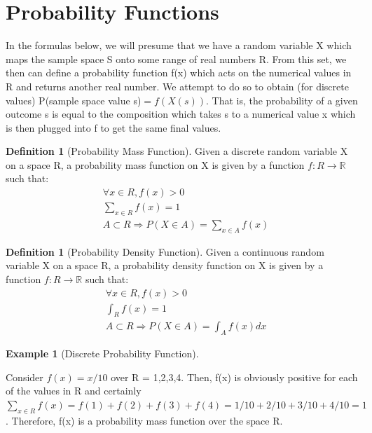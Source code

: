\documentclass[10pt,]{book}
\theoremstyle{plain}
\theoremstyle{definition}
\newtheorem{definition}[theorem]{Definition}
\theoremstyle{definition}
\newtheorem{example}[theorem]{Example}
\theoremstyle{definition}
\numberwithin{equation}{section}
\newcommand{\gt}{ > }
\begin{document}
\section[Probability Functions]{Probability Functions}\label{section-23}
In the formulas below, we will presume that we have a random variable X which maps the sample space S onto some range of real numbers R.  From this set, we then can define a probability function f(x) which acts on the numerical values in R and returns another real number.  We attempt to do so to obtain (for discrete values) P(sample space value s)\( = f(X(s))\).  That is, the probability of a given outcome s is equal to the composition which takes s to a numerical value x which is then plugged into f to get the same final values.%
\begin{definition}[Probability Mass Function]\label{definition-27}
Given a discrete random variable X on a space R, a probability mass function on X is given by a function \(f:R \rightarrow \mathbb{R}\) such that:
		\begin{align*}
& \forall x \in R , f(x) \gt 0\\
& \sum_{x \in R} f(x) = 1\\
& A \subset R \Rightarrow P(X \in A) = \sum_{x \in A}f(x)
\end{align*}\end{definition}
\begin{definition}[Probability Density Function]\label{definition-28}
Given a continuous random variable X on a space R, a probability density function on X is given by a function \(f:R \rightarrow \mathbb{R}\) such that:
			\begin{align*}
& \forall x \in R , f(x) \gt 0\\
& \int_{R} f(x) = 1\\
& A \subset R \Rightarrow P(X \in A) = \int_{A} f(x) dx
\end{align*}\end{definition}
\begin{example}[Discrete Probability Function]\label{example-15}

	Consider \(f(x) = x/10\) over R = {1,2,3,4}.  Then, f(x) is obviously positive for each of the values in R and certainly \(\sum_{x \in R} f(x) = f(1) + f(2) + f(3) + f(4) = 1/10 + 2/10 + 3/10 + 4/10 = 1\). Therefore, f(x) is a probability mass function over the space R.
\end{example}
\end{document}
